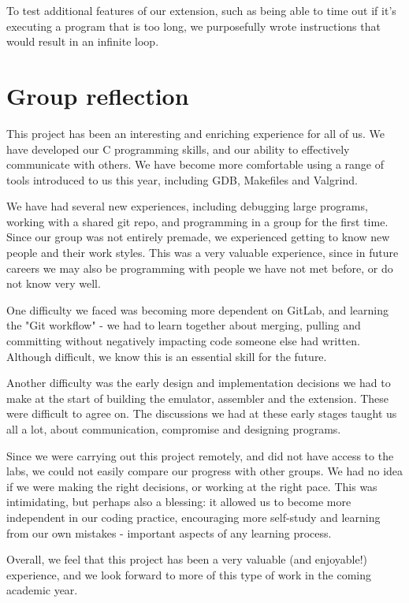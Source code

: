 \documentclass[11pt]{article}
\begin{document}
To test additional features of our extension, such as being able to time out if it's executing a program that is too long, we purposefully wrote instructions that would result in an infinite loop.

\section*{Group reflection}

This project has been an interesting and enriching experience for all of us. We have developed our C programming skills, and our ability to effectively communicate with others. We have become more comfortable using a range of tools introduced to us this year, including GDB, Makefiles and Valgrind.

We have had several new experiences, including debugging large programs, working with a shared git repo, and programming in a group for the first time. Since our group was not entirely premade, we experienced getting to know new people and their work styles. This was a very valuable experience, since in future careers we may also be programming with people we have not met before, or do not know very well.

One difficulty we faced was becoming more dependent on GitLab, and learning the "Git workflow" - we had to learn together about merging, pulling and committing without negatively impacting code someone else had written. Although difficult, we know this is an essential skill for the future.

Another difficulty was the early design and implementation decisions we had to make at the start of building the emulator, assembler and the extension. These were difficult to agree on. The discussions we had at these early stages taught us all a lot, about communication, compromise and designing programs.

Since we were carrying out this project remotely, and did not have access to the labs, we could not easily compare our progress with other groups. We had no idea if we were making the right decisions, or working at the right pace. This was intimidating, but perhaps also a blessing: it allowed us to become more independent in our coding practice, encouraging more self-study and learning from our own mistakes - important aspects of any learning process.

Overall, we feel that this project has been a very valuable (and enjoyable!) experience, and we look forward to more of this type of work in the coming academic year.
\end{document}
